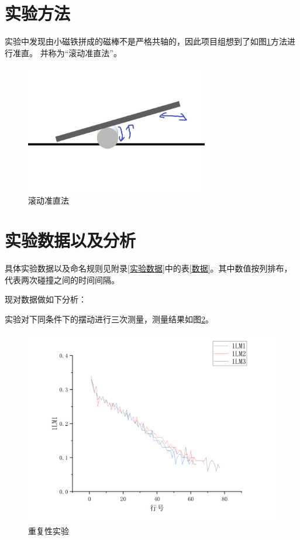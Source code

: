 \documentclass[AutoFakeBold]{LZUThesis}
\begin{document}
\section{实验方法}
实验中发现由小磁铁拼成的磁棒不是严格共轴的，因此项目组想到了如图\ref{a_way}方法进行准直。
并称为“滚动准直法”。
\begin{figure}[H]
    \centering
    \includegraphics[width=8cm]{figures/a_way.png}
    \caption{滚动准直法}
    \label{a_way}
\end{figure}

\section{实验数据以及分析}
具体实验数据以及命名规则见附录\ref{实验数据}中的表\ref{数据}。其中数值按列排布，代表两次碰撞之间的时间间隔。

现对数据做如下分析：

实验对下同条件下的摆动进行三次测量，测量结果如图\ref{re}。
\begin{figure}[H]
    \centering
    \includegraphics[width=12cm]{figures/重复性.png}
    \caption{重复性实验}
    \label{re}
\end{figure}
\end{document}
